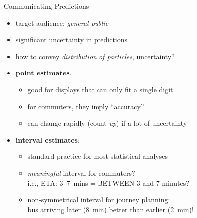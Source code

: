 \documentclass[10pt,t]{beamer}
\begin{document}
\begin{frame}{Communicating Predictions}
  \onslide<+->

  \begin{itemize}[<+->]

  \item target audience: \emph{general public}
    
  \item significant uncertainty in predictions

  \item how to convey \emph{distribution of particles}, uncertainty?

  \item \textbf{point estimates}:
    \begin{itemize}[<1->]
    \item good for displays that can only fit a single digit
    \item for commuters, they imply ``accuracy''
    \item can change rapidly (count \emph{up}) if a lot of uncertainty
    \end{itemize}
   
    
  \item \textbf{interval estimates}:
    \begin{itemize}[<1->]
    \item standard practice for most statistical analyses
    \item \emph{meaningful} interval for commuters?\\
      i.e., ETA: 3--7~mins = BETWEEN 3 and 7 minutes?
    \item non-symmetrical interval for journey planning:\\
      bus arriving later (8~min) better than earlier (2~min)!
    \end{itemize}
  \end{itemize}

\end{frame}
\end{document}
